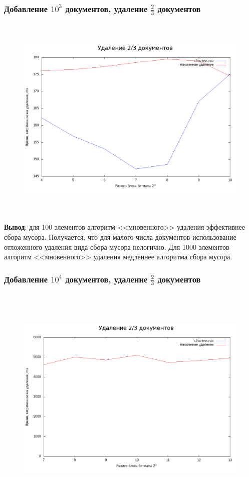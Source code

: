 \subsubsection{Добавление $10^3$ документов, удаление $\frac{2}{3}$ документов}
\begin{figure}[H]
\includegraphics[width=\linewidth, height=10cm]{fig/time_1e3.png}
\end{figure}

\textbf{Вывод}: для 100 элементов алгоритм <<мновенного>> удаления
эффективнее сбора мусора. Получается, что для малого числа документов использование
отложенного удаления вида сбора мусора нелогично. Для 1000 элементов алгоритм
<<мновенного>> удаления медленнее алгоритма сбора мусора.

\subsubsection{Добавление $10^4$ документов, удаление $\frac{2}{3}$ документов}
\begin{figure}[H]
\includegraphics[width=\linewidth, height=11cm]{fig/time_1e4.png}
\end{figure}

